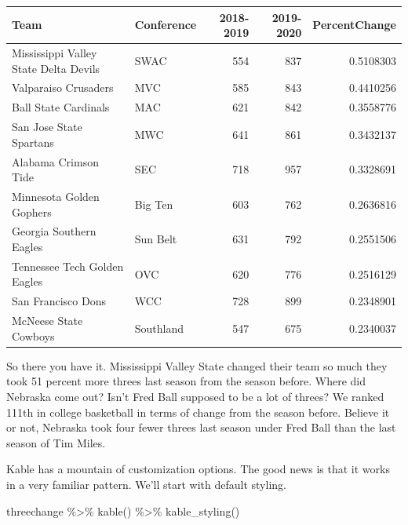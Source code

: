 \documentclass[
]{book}
\newenvironment{Shaded}{\begin{snugshade}}{\end{snugshade}}
\newcommand{\FunctionTok}[1]{\textcolor[rgb]{0.00,0.00,0.00}{#1}}
\newcommand{\NormalTok}[1]{#1}
\newcommand{\SpecialCharTok}[1]{\textcolor[rgb]{0.00,0.00,0.00}{#1}}
\begin{document}
\begin{tabular}{l|l|r|r|r}
\hline
Team & Conference & 2018-2019 & 2019-2020 & PercentChange\\
\hline
Mississippi Valley State Delta Devils & SWAC & 554 & 837 & 0.5108303\\
\hline
Valparaiso Crusaders & MVC & 585 & 843 & 0.4410256\\
\hline
Ball State Cardinals & MAC & 621 & 842 & 0.3558776\\
\hline
San Jose State Spartans & MWC & 641 & 861 & 0.3432137\\
\hline
Alabama Crimson Tide & SEC & 718 & 957 & 0.3328691\\
\hline
Minnesota Golden Gophers & Big Ten & 603 & 762 & 0.2636816\\
\hline
Georgia Southern Eagles & Sun Belt & 631 & 792 & 0.2551506\\
\hline
Tennessee Tech Golden Eagles & OVC & 620 & 776 & 0.2516129\\
\hline
San Francisco Dons & WCC & 728 & 899 & 0.2348901\\
\hline
McNeese State Cowboys & Southland & 547 & 675 & 0.2340037\\
\hline
\end{tabular}

So there you have it. Mississippi Valley State changed their team so much they took 51 percent more threes last season from the season before. Where did Nebraska come out? Isn't Fred Ball supposed to be a lot of threes? We ranked 111th in college basketball in terms of change from the season before. Believe it or not, Nebraska took four fewer threes last season under Fred Ball than the last season of Tim Miles.

Kable has a mountain of customization options. The good news is that it works in a very familiar pattern. We'll start with default styling.

\begin{Shaded}
\begin{Highlighting}[]
\NormalTok{threechange }\SpecialCharTok{\%\textgreater{}\%} 
  \FunctionTok{kable}\NormalTok{() }\SpecialCharTok{\%\textgreater{}\%} 
  \FunctionTok{kable\_styling}\NormalTok{()}
\end{Highlighting}
\end{Shaded}
\end{document}

